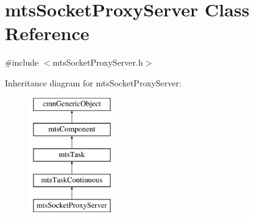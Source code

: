 \hypertarget{classmts_socket_proxy_server}{}\section{mts\+Socket\+Proxy\+Server Class Reference}
\label{classmts_socket_proxy_server}


{\ttfamily \#include $<$mts\+Socket\+Proxy\+Server.\+h$>$}

Inheritance diagram for mts\+Socket\+Proxy\+Server\+:\begin{figure}[H]
\begin{center}
\leavevmode
\includegraphics[height=5.000000cm]{de/dad/classmts_socket_proxy_server}
\end{center}
\end{figure}
